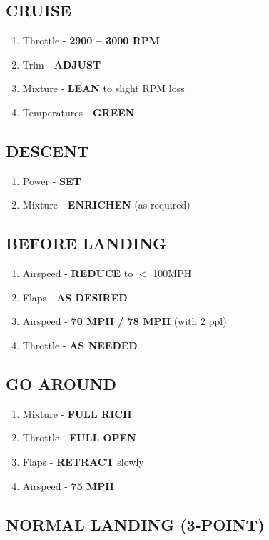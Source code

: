 \documentclass[14pt,letterpaper, twoside]{extarticle}
\begin{document}
\subsection{CRUISE}

\begin{enumerate}
\item Throttle - \textbf{2900 -- 3000 RPM}
\item Trim - \textbf{ADJUST}
\item Mixture - \textbf{LEAN} to slight RPM loss
\item Temperatures - \textbf{GREEN}
\end{enumerate}
	
	
\subsection{DESCENT}
\begin{enumerate}
\item Power - \textbf{SET}
\item Mixture - \textbf{ENRICHEN} (as required)
\end{enumerate}
	
\subsection{BEFORE LANDING}

\begin{enumerate}
\item Airspeed - \textbf{REDUCE} to $<$ 100MPH 
\item Flaps - \textbf{AS DESIRED}
\item Airspeed - \textbf{70 MPH / 78 MPH} (with 2 ppl)
\item Throttle - \textbf{AS NEEDED}
\end{enumerate}

\subsection{GO AROUND}

\begin{enumerate}
\item Mixture - \textbf{FULL RICH}
\item Throttle - \textbf{FULL OPEN}
\item Flaps - \textbf{RETRACT} slowly
\item Airspeed - \textbf{75 MPH}
\end{enumerate}
	
\subsection{NORMAL LANDING (3-POINT)}
\end{document}
